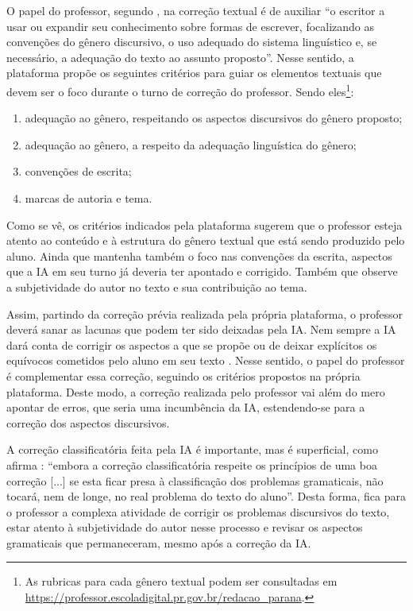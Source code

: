 \documentclass[portuguese]{textolivre}
\begin{document}
O papel do professor, segundo \textcite[p. 218]{fuzer2012bilhete}, na correção textual é de auxiliar ``o escritor a usar ou expandir seu conhecimento sobre formas de escrever, focalizando as convenções do gênero discursivo, o uso adequado do sistema linguístico e, se necessário, a adequação do texto ao assunto proposto''. Nesse sentido, a plataforma \textcite{parana2023} propõe os seguintes critérios para guiar os elementos textuais que devem ser o foco durante o turno de correção do professor. Sendo eles\footnote{As rubricas para cada gênero textual podem ser consultadas em \url{https://professor.escoladigital.pr.gov.br/redacao_parana}.}:

\begin{enumerate}[label=\alph*)] 
\item adequação ao gênero, respeitando os aspectos discursivos do gênero proposto;
\item adequação ao gênero, a respeito da adequação linguística do gênero;
\item convenções de escrita;
\item marcas de autoria e tema.
\end{enumerate}

Como se vê, os critérios indicados pela plataforma sugerem que o professor esteja atento ao conteúdo e à estrutura do gênero textual que está sendo produzido pelo aluno. Ainda que mantenha também o foco nas convenções da escrita, aspectos que a IA em seu turno já deveria ter apontado e corrigido. Também que observe a subjetividade do autor no texto e sua contribuição ao tema.

Assim, partindo da correção prévia realizada pela própria plataforma, o professor deverá sanar as lacunas que podem ter sido deixadas pela IA. Nem sempre a IA dará conta de corrigir os aspectos a que se propõe ou de deixar explícitos os equívocos cometidos pelo aluno em seu texto \cite{lima2023}. Nesse sentido, o papel do professor é complementar essa correção, seguindo os critérios propostos na própria plataforma. Deste modo, a correção realizada pelo professor vai além do mero apontar de erros, que seria uma incumbência da IA, estendendo-se para a correção dos aspectos discursivos.

A correção classificatória feita pela IA é importante, mas é superficial, como afirma \textcite[p. 325]{conceicao2004}: ``embora a correção classificatória respeite os princípios de uma boa correção [...] se esta ficar presa à classificação dos problemas gramaticais, não tocará, nem de longe, no real problema do texto do aluno''. Desta forma, fica para o professor a complexa atividade de corrigir os problemas discursivos do texto, estar atento à subjetividade do autor nesse processo e revisar os aspectos gramaticais que permaneceram, mesmo após a correção da IA.
\end{document}
